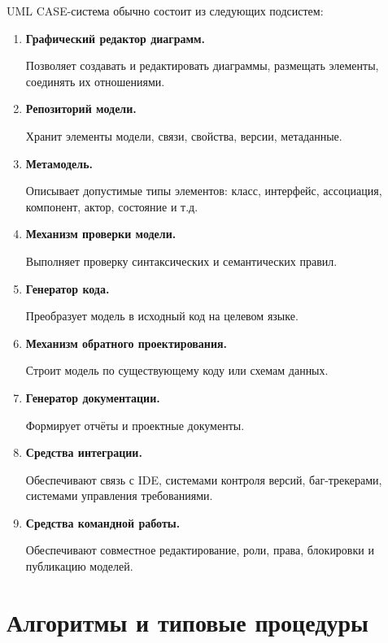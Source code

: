 \documentclass[12pt,a4paper]{article}
\begin{document}
UML CASE-система обычно состоит из следующих подсистем:

\begin{enumerate}
    \item \textbf{Графический редактор диаграмм.}

    Позволяет создавать и редактировать диаграммы, размещать элементы, соединять их отношениями.

    \item \textbf{Репозиторий модели.}

    Хранит элементы модели, связи, свойства, версии, метаданные.

    \item \textbf{Метамодель.}

    Описывает допустимые типы элементов: класс, интерфейс, ассоциация, компонент, актор, состояние и т.д.

    \item \textbf{Механизм проверки модели.}

    Выполняет проверку синтаксических и семантических правил.

    \item \textbf{Генератор кода.}

    Преобразует модель в исходный код на целевом языке.

    \item \textbf{Механизм обратного проектирования.}

    Строит модель по существующему коду или схемам данных.

    \item \textbf{Генератор документации.}

    Формирует отчёты и проектные документы.

    \item \textbf{Средства интеграции.}

    Обеспечивают связь с IDE, системами контроля версий, баг-трекерами, системами управления требованиями.

    \item \textbf{Средства командной работы.}

    Обеспечивают совместное редактирование, роли, права, блокировки и публикацию моделей.
\end{enumerate}

\section{Алгоритмы и типовые процедуры}
\end{document}
